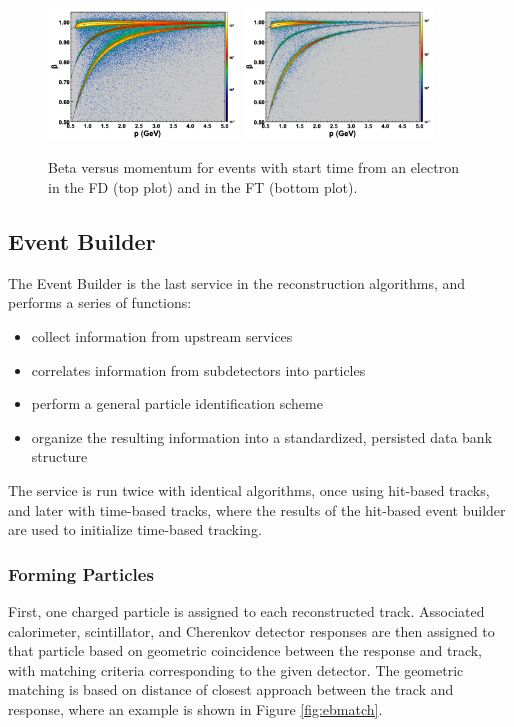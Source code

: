\begin{figure}
\centering
\includegraphics[width=0.45\textwidth]{pics/ftof_betap.png}
\includegraphics[width=0.45\textwidth]{pics/ft_betap.png}
\caption{Beta versus momentum for events with start time from an electron in the FD (top plot) and in the FT (bottom plot).}
\label{fig:betavsp}
\end{figure}

\subsection{Event Builder}\label{sec:eb}
The Event Builder is the last service in the reconstruction algorithms, and performs a series of functions:
\begin{itemize}
    \item collect information from upstream services
    \item correlates information from subdetectors into particles
    \item perform a general particle identification scheme
    \item organize the resulting information into a standardized, persisted data bank structure
\end{itemize}
The service is run twice with identical algorithms, once using hit-based tracks, and later with time-based tracks, where the results of the hit-based event builder are used to initialize time-based tracking.

\subsubsection{Forming Particles}
First, one charged particle is assigned to each reconstructed track.  Associated calorimeter, scintillator, and Cherenkov detector responses are then assigned to that particle based on geometric coincidence between the response and track, with matching criteria corresponding to the given detector.  The geometric matching is based on distance of closest approach between the track and response, where an example is shown in Figure \ref{fig:ebmatch}.

